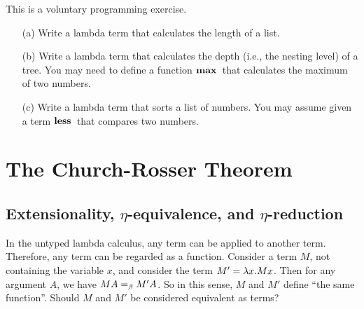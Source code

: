 \documentclass{article}
\begin{document}
\begin{exercise}
  This is a voluntary programming exercise.
  \begin{enumerate}
  \item[(a)] Write a lambda term that calculates the length of a
    list.
  \item[(b)] Write a lambda term that calculates the depth (i.e., the
    nesting level) of a tree. You may need to define a function
    $\mathop{\textbf{\bf max}\,}$ that calculates the maximum of two numbers.
  \item[(c)] Write a lambda term that sorts a list of numbers. You
    may assume given a term $\mathop{\textbf{\bf less}\,}$ that compares two numbers. 
  \end{enumerate}
\end{exercise}

\section{The Church-Rosser Theorem}

\subsection{Extensionality, $\eta$-equivalence, and $\eta$-reduction}

In the untyped lambda calculus, any term can be applied to another
term. Therefore, any term can be regarded as a function.  Consider a
term $M$, not containing the variable $x$, and consider the term
$M'=\lambda x.Mx$. Then for any argument $A$, we have $MA=_{\beta} M'A$. So in
this sense, $M$ and $M'$ define ``the same function''.  Should $M$ and
$M'$ be considered equivalent as terms?
\end{document}
